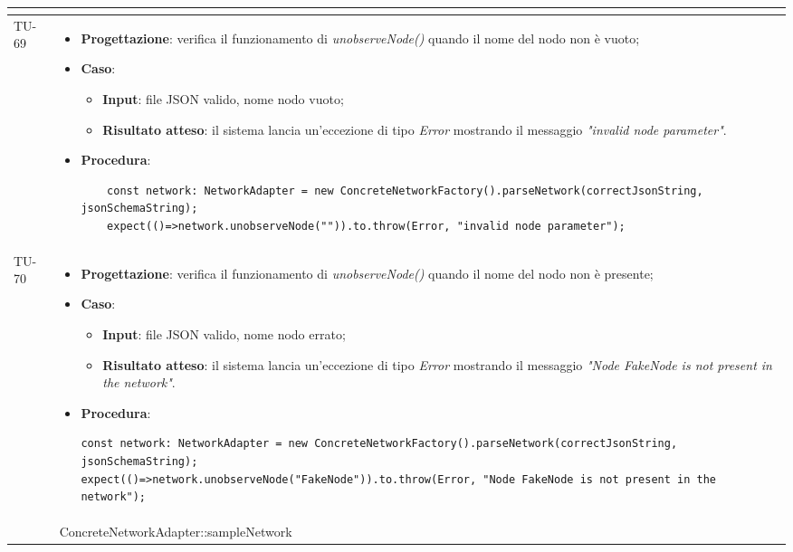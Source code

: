 \begin{longtable}{|C{1.5cm}|C{14.5cm}|}
\begin{itemize}
\end{itemize}\\
\hline
{TU-69} &
\begin{itemize}
	\item \textbf{Progettazione}: verifica il funzionamento di \emph{unobserveNode()} quando il nome del nodo non è vuoto;
	\item \textbf{Caso}: 
	\begin{itemize}
		\item \textbf{Input}: file JSON valido, nome nodo vuoto;
		\item \textbf{Risultato atteso}: il sistema lancia un'eccezione di tipo \emph{Error} mostrando il messaggio \emph{"invalid node parameter"}.
	\end{itemize}
	\item \textbf{Procedura}:
	\begin{lstlisting}
	const network: NetworkAdapter = new ConcreteNetworkFactory().parseNetwork(correctJsonString, jsonSchemaString);
	expect(()=>network.unobserveNode("")).to.throw(Error, "invalid node parameter");
	\end{lstlisting}
\end{itemize}\\
\hline
{TU-70} &
\begin{itemize}
	\item \textbf{Progettazione}: verifica il funzionamento di \emph{unobserveNode()} quando il nome del nodo non è presente;
	\item \textbf{Caso}: 
	\begin{itemize}
		\item \textbf{Input}: file JSON valido, nome nodo errato;
		\item \textbf{Risultato atteso}: il sistema lancia un'eccezione di tipo \emph{Error} mostrando il messaggio \emph{"Node FakeNode is not present in the network"}.
	\end{itemize}
	\item \textbf{Procedura}:
	\begin{lstlisting}
const network: NetworkAdapter = new ConcreteNetworkFactory().parseNetwork(correctJsonString, jsonSchemaString);
expect(()=>network.unobserveNode("FakeNode")).to.throw(Error, "Node FakeNode is not present in the network");
	\end{lstlisting}
\end{itemize}\\
\hline
{} & ConcreteNetworkAdapter::sampleNetwork
\\ \hline

\end{longtable}
